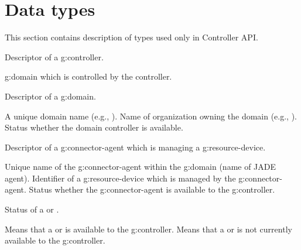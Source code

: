 \section{Data types}

This section contains description of types used only in Controller API.

\begin{Api}


Descriptor of a \gls{g:controller}.
\begin{ApiClassAttributes}
 \Gls{g:domain} which is controlled by the controller.
\end{ApiClassAttributes}

Descriptor of a \gls{g:domain}.
\begin{ApiClassAttributes}
 A unique domain name (e.g., ).
 Name of organization owning the domain (e.g., ).
 Status whether the domain controller is available.
\end{ApiClassAttributes}

Descriptor of a \gls{g:connector-agent} which is managing a \gls{g:resource-device}.
\begin{ApiClassAttributes}
 Unique name of the \gls{g:connector-agent} within the \gls{g:domain} (name of JADE agent).
 Identifier of a \gls{g:resource-device} which is managed by the \gls{g:connector-agent}.
 Status whether the \gls{g:connector-agent} is available to the \gls{g:controller}.
\end{ApiClassAttributes}

Status of a  or .
\begin{ApiEnumValues}
 Means that a  or  is available to the \gls{g:controller}.
 Means that a  or  is not currently available to the \gls{g:controller}.
\end{ApiEnumValues}


\end{Api}
